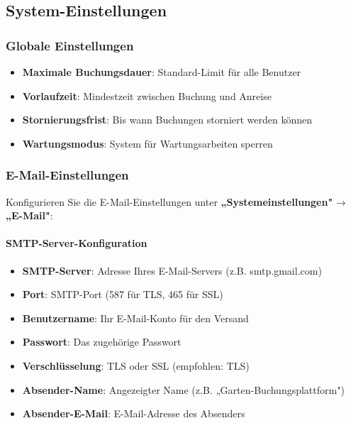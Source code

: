 \subsection{System-Einstellungen}

\subsubsection{Globale Einstellungen}

\begin{itemize}
    \item \textbf{Maximale Buchungsdauer}: Standard-Limit für alle Benutzer
    \item \textbf{Vorlaufzeit}: Mindestzeit zwischen Buchung und Anreise
    \item \textbf{Stornierungsfrist}: Bis wann Buchungen storniert werden können
    \item \textbf{Wartungsmodus}: System für Wartungsarbeiten sperren
\end{itemize}

\subsubsection{E-Mail-Einstellungen}

Konfigurieren Sie die E-Mail-Einstellungen unter \textbf{„Systemeinstellungen"} → \textbf{„E-Mail"}:

\paragraph{SMTP-Server-Konfiguration}

\begin{itemize}
    \item \textbf{SMTP-Server}: Adresse Ihres E-Mail-Servers (z.B. smtp.gmail.com)
    \item \textbf{Port}: SMTP-Port (587 für TLS, 465 für SSL)
    \item \textbf{Benutzername}: Ihr E-Mail-Konto für den Versand
    \item \textbf{Passwort}: Das zugehörige Passwort
    \item \textbf{Verschlüsselung}: TLS oder SSL (empfohlen: TLS)
    \item \textbf{Absender-Name}: Angezeigter Name (z.B. „Garten-Buchungsplattform")
    \item \textbf{Absender-E-Mail}: E-Mail-Adresse des Absenders
\end{itemize}

